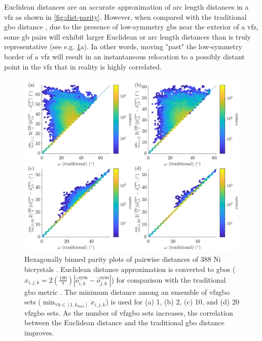 \documentclass[final,twocolumn,12pt]{elsarticle}
\begin{document}
Euclidean distances are an accurate approximation of arc length distances in a \gls{vfz} as shown in \cref{fig:dist-parity}. %
However, when compared with the traditional \gls{gbo} distance \cite{francisGeodesicOctonionMetric2019}, due to the presence of low-symmetry \glspl{gb} near the exterior of a \gls{vfz}, some \gls{gb} pairs will exhibit larger Euclidean or arc length distances than is truly representative (see e.g. \cref{fig:dist-ensemble-k1-2-10-20}a). In other words, moving "past" the low-symmetry border of a \gls{vfz} will result in an instantaneous relocation to a possibly distant point in the \gls{vfz} that in reality is highly correlated.
\begin{figure}[!ht]
    \centering
    \includegraphics[scale=1]{figures/dist-ensemble-k1-2-10-20.png}
    \caption{Hexagonally binned parity plots of pairwise distances of 388 Ni bicrystals \cite{olmstedSurveyComputedGrain2009a}. Euclidean distance approximation is converted to \glspl{gbo} ($x_{i,j,k}=2\left(\frac{180}{\pi}\right)|\hat{o}_{i,k}^{\text{sym}}-\hat{o}_{j,k}^{\text{sym}}|$) for comparison with the traditional \gls{gbo} metric \cite{chesserLearningGrainBoundary2020}. The minimum distance among an ensemble of \gls{vfzgbo} sets ($\min_{\forall k \in [1,k_{max}]}x_{i,j,k}$) is used for (a) 1, (b) 2, (c) 10, and (d) 20 \gls{vfzgbo} sets. As the number of \gls{vfzgbo} sets increases, the correlation between the Euclidean distance and the traditional \gls{gbo} distance improves.}
    \label{fig:dist-ensemble-k1-2-10-20}
\end{figure}
\end{document}
